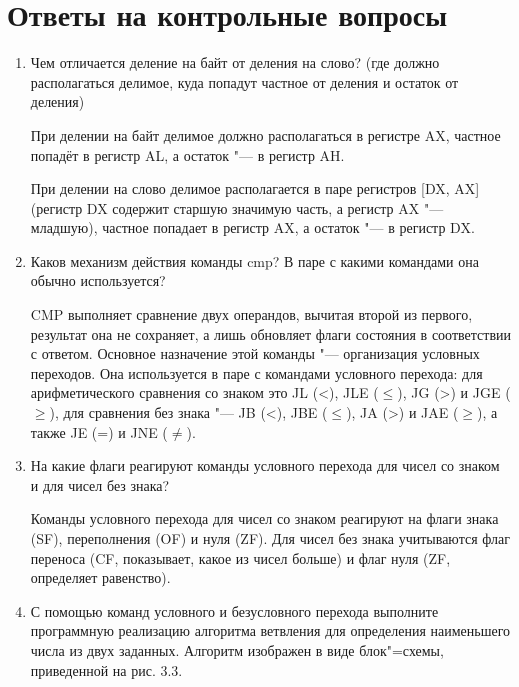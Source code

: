 \documentclass[bachelor, och, otchet]{SCWorks}
\begin{document}
\section{Ответы на контрольные вопросы}
\begin{enumerate}
\item Чем отличается деление на байт от деления на слово? (где должно располагаться делимое, куда попадут частное от деления и остаток от деления)

При делении на байт делимое должно располагаться в регистре AX, частное попадёт в регистр AL, а остаток "--- в регистр AH.

При делении на слово делимое располагается в паре регистров [DX, AX] (регистр DX содержит старшую значимую часть, а регистр AX "--- младшую), частное попадает в регистр AX, а остаток "--- в регистр DX.
\item Каков механизм действия команды cmp? В паре с какими командами она обычно используется?

CMP выполняет сравнение двух операндов, вычитая второй из первого, результат она не сохраняет, а лишь обновляет флаги состояния в соответствии с ответом. Основное назначение этой команды "--- организация условных переходов. Она используется в паре с командами условного перехода: для арифметического сравнения со знаком это JL (<), JLE ($\leq$), JG (>) и JGE ($\geq$), для сравнения без знака "--- JB (<), JBE ($\leq$), JA (>) и JAE ($\geq$), а также JE (=) и JNE ($\ne$).

\item На какие флаги реагируют команды условного перехода для чисел со знаком и для чисел без знака?

Команды условного перехода для чисел со знаком реагируют на флаги знака (SF), переполнения (OF) и нуля (ZF). Для чисел без знака учитываются флаг переноса (CF, показывает, какое из чисел больше) и флаг нуля (ZF, определяет равенство).

\item С помощью команд условного и безусловного перехода выполните программную реализацию алгоритма ветвления для определения наименьшего числа из двух заданных. Алгоритм изображен в виде блок"=схемы, приведенной на рис. 3.3.


\end{enumerate}
\end{document}
